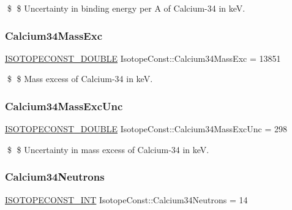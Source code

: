 \$ \$ Uncertainty in binding energy per A of Calcium-\/34 in keV. \mbox{\label{group___isotope_const-_calcium-_ca34_ga1622962df6c1f5673a1ed90e7bf483ba}} 
\subsubsection{\texorpdfstring{Calcium34\+Mass\+Exc}{Calcium34MassExc}}
{\footnotesize\ttfamily \mbox{\hyperlink{group___isotope_const-_macros_ga8f45a7272ce02c0b4c65c44636ed719a}{I\+S\+O\+T\+O\+P\+E\+C\+O\+N\+S\+T\+\_\+\+D\+O\+U\+B\+LE}} Isotope\+Const\+::\+Calcium34\+Mass\+Exc = 13851}

\$ \$ Mass excess of Calcium-\/34 in keV. \mbox{\label{group___isotope_const-_calcium-_ca34_ga977b5e78677e6defbd3dbb15b1dec627}} 
\subsubsection{\texorpdfstring{Calcium34\+Mass\+Exc\+Unc}{Calcium34MassExcUnc}}
{\footnotesize\ttfamily \mbox{\hyperlink{group___isotope_const-_macros_ga8f45a7272ce02c0b4c65c44636ed719a}{I\+S\+O\+T\+O\+P\+E\+C\+O\+N\+S\+T\+\_\+\+D\+O\+U\+B\+LE}} Isotope\+Const\+::\+Calcium34\+Mass\+Exc\+Unc = 298}

\$ \$ Uncertainty in mass excess of Calcium-\/34 in keV. \mbox{\label{group___isotope_const-_calcium-_ca34_ga16f135adbb62ced75e020855a0861ba5}} 
\subsubsection{\texorpdfstring{Calcium34\+Neutrons}{Calcium34Neutrons}}
{\footnotesize\ttfamily \mbox{\hyperlink{group___isotope_const-_macros_ga5f18360b3e99483a35c32d789e62621c}{I\+S\+O\+T\+O\+P\+E\+C\+O\+N\+S\+T\+\_\+\+I\+NT}} Isotope\+Const\+::\+Calcium34\+Neutrons = 14}


